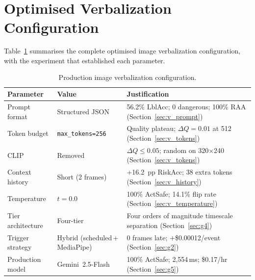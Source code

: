 \documentclass[journal]{IEEEtran}
\begin{document}
\appendix
\section{Optimised Verbalization Configuration}
\label{appendix:config}

Table~\ref{tab:config} summarises the complete optimised image verbalization
configuration, with the experiment that established each parameter.

\begin{table}[!h]
  \caption{Production image verbalization configuration.}
  \label{tab:config}
  \centering
  \small
  \begin{tabular}{p{2.2cm}p{1.8cm}p{4cm}}
    \toprule
    Parameter & Value & Justification \\
    \midrule
    Prompt format    & Structured JSON & 56.2\% LblAcc; 0 dangerous; 100\% RAA (Section~\ref{sec:v_prompt}) \\
    Token budget     & \texttt{max\_tokens=256} & Quality plateau; $\Delta Q = 0.01$ at 512 (Section~\ref{sec:v_tokens}) \\
    CLIP             & Removed  & $\Delta Q \leq 0.05$; random on 320$\times$240 (Section~\ref{sec:v_tokens}) \\
    Context history  & Short (2 frames) & $+$16.2~pp RiskAcc; 38 extra tokens (Section~\ref{sec:v_history}) \\
    Temperature      & $t=0.0$  & 100\% ActSafe; 14.1\% flip rate (Section~\ref{sec:v_temperature}) \\
    Tier architecture & Four-tier & Four orders of magnitude timescale separation (Section~\ref{sec:g4}) \\
    Trigger strategy & Hybrid (scheduled\,+\,MediaPipe) & 0 frames late; $+$\$0.00012/event (Section~\ref{sec:g2}) \\
    Production model & Gemini~2.5-Flash & 100\% ActSafe; 2,554\,ms; \$0.17/hr (Section~\ref{sec:g5}) \\
    \bottomrule
  \end{tabular}
\end{table}
\end{document}
